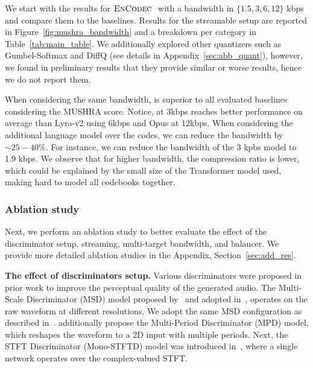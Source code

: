 We start with the results for $\textsc{EnCodec}~$ with a bandwidth in $\{1.5, 3, 6, 12\}$ kbps and compare them to the baselines. Results for the streamable setup are reported in Figure~\ref{fig:mushra_bandwidth} and a breakdown per category in Table~\ref{tab:main_table}. We additionally explored other quantizers such as Gumbel-Softmax and DiffQ (see details in Appendix~\ref{sec:abb_quant}), however, we found in preliminary results that they provide similar or worse results, hence we do not report them.

When considering the same bandwidth, \encodec is superior to all evaluated baselines considering the MUSHRA score. Notice, \encodec at 3kbps reaches better performance on average than Lyra-v2 using 6kbps and Opus at 12kbps. When considering the additional language model over the codes, we can reduce the bandwidth by $\sim 25-40\%$. For instance, we can reduce the bandwidth of the 3 kpbs model to 1.9 kbps. We observe that for higher bandwidth, 
the compression ratio is lower, which could be explained by the small size of the Transformer model used, making
hard to model all codebooks together.


\subsubsection{Ablation study}
\label{results:comparison}
Next, we perform an ablation study to better evaluate the effect of the discriminator setup, streaming, multi-target bandwidth, and balancer. We provide more detailed ablation studies in the Appendix, Section~\ref{sec:add_res}.

{\noindent \bf The effect of discriminators setup.}
Various discriminators were proposed in prior work to improve the perceptual quality of the generated audio. The Multi-Scale Discriminator (MSD) model proposed by~\citet{melgan} and adopted in~\citep{hifigan, hifi++, zeghidour2021soundstream}, operates on the raw waveform at different resolutions. We adopt the same MSD configuration as described in~\citet{zeghidour2021soundstream}. \citet{hifigan} additionally propose the Multi-Period Discriminator (MPD) model, which reshapes the waveform to a 2D input with multiple periods.
Next, the STFT Discriminator (Mono-STFTD) model was introduced in~\citet{zeghidour2021soundstream}, where a single network operates over the complex-valued STFT. 

